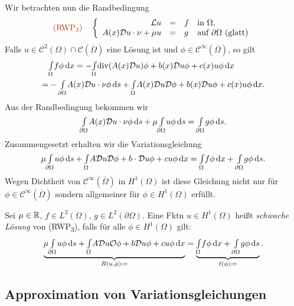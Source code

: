 \documentclass{cheat-sheet}
\newcommand{\Cont}{\mathcal{C}} %
\newcommand{\clos}[1]{\overline{#1}} %
\newcommand{\cOmega}{\clos{\Omega}} %
\newcommand{\bOmega}{\partial \Omega} %
\newcommand{\IntOmega}[2]{\AInt{\Omega}{#1}{#2}} %
\newcommand{\IntbOmega}[2]{\AInt{\bOmega}{#1}{#2}} %
\newcommand{\LL}{\mathcal{L}} %
\DeclareMathOperator{\dive}{div} %
\newcommand{\tss}[1]{\textsubscript{#1}} %
\renewcommand{\O}{\mathcal{O}} %
\newcommand{\DO}{\mathcal{D}} %
\newcommand{\probl}[1]{\textcolor{ProblemColor}{#1}}
\begin{document}

\begin{prob}
  Wir betrachten nun die Randbedingung
  \[
    \text{\probl{(RWP\tss{3})}} \quad
    \left\{ \begin{array}{r c l l}
      \LL u & = & f & \text{in } \Omega, \\
      A(x) \DO u \cdot \nu + \mu u & = & g & \text{auf } \bOmega \text{ (glatt)}
    \end{array} \right.
  \]
  Falls $u \in \Cont^2(\Omega) \cap \Cont(\cOmega)$ eine Lösung ist und $\phi \in \Cont^\infty(\cOmega)$, so gilt
  \begin{align*}
    & \IntOmega{f \phi}{x}
    = - \IntOmega{\dive(A(x) \DO u) \phi + b(x) \DO u \phi + c(x) u \phi}{x} \\
    = & - \IntbOmega{A(x) \DO u \cdot \nu \phi}{s} + \IntOmega{A(x) \DO u \DO \phi + b(x) \DO u \phi + c(x) u \phi}{x}.
  \end{align*}
  Aus der Randbedingung bekommen wir
  \[
    \IntbOmega{A(x) \DO u \cdot \nu \phi}{s} + \mu \IntbOmega{u \phi}{s} = \IntbOmega{g \phi}{s}.
  \]
  Zusammengesetzt erhalten wir die Variationsgleichung
  \[
    \mu \IntbOmega{u \phi}{s} + \IntOmega{A \DO u \DO \phi + b \cdot \DO u \phi + c u \phi}{x} = \IntOmega{f \phi}{x} + \IntbOmega{g \phi}{s}.
  \]
  Wegen Dichtheit von $\Cont^\infty(\cOmega)$ in $H^1(\Omega)$ ist diese Gleichung nicht nur für $\phi \in \Cont^\infty(\cOmega)$ sondern allgemeiner für $\phi \in H^1(\Omega)$ erfüllt.
\end{prob}

\begin{defn}
  Sei $\mu \in \mathbb{R}$, $f \in L^2(\Omega)$, $g \in L^2(\bOmega)$.
  Eine Fktn $u \in H^1(\Omega)$ heißt \textit{schwache Lösung} von (RWP\tss{3}), falls für alle $\phi \in H^1(\Omega)$ gilt:
  \[
    \underbrace{\mu \IntbOmega{u \phi}{s} + \IntOmega{A \DO u \O \phi + b \DO u \phi + c u \phi}{x}}_{B(u, \phi) \coloneqq} =
    \underbrace{\IntOmega{f \phi}{x} + \IntbOmega{g \phi}{s}}_{\ell(\phi) \coloneqq}.
  \]
\end{defn}


\subsection{Approximation von Variationsgleichungen}
\end{document}
